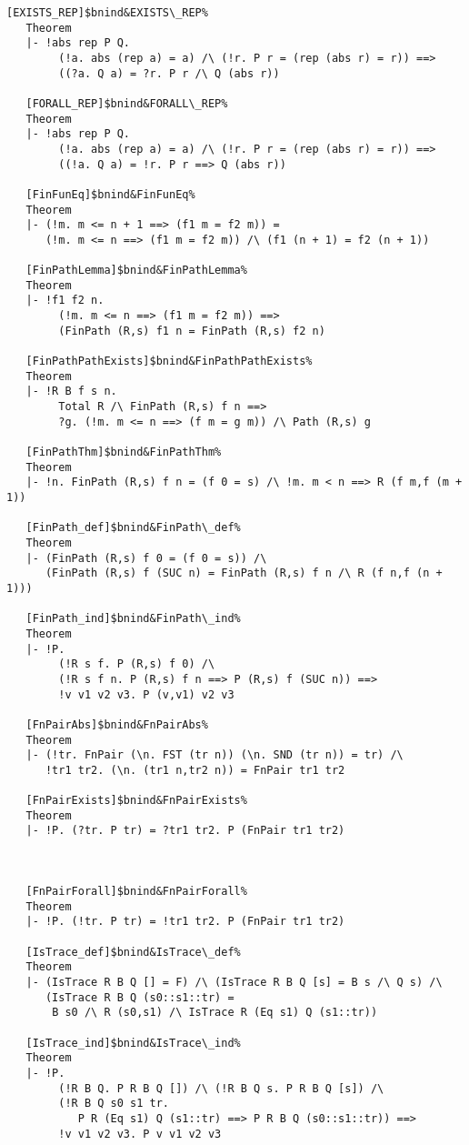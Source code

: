 \documentclass[12pt]{article}
\begin{document}
\begin{footnotesize}
\begin{Verbatim}[commandchars=\$\&\%]
   [EXISTS_REP]$bnind&EXISTS\_REP%
   Theorem
   |- !abs rep P Q.
        (!a. abs (rep a) = a) /\ (!r. P r = (rep (abs r) = r)) ==>
        ((?a. Q a) = ?r. P r /\ Q (abs r))
   
   [FORALL_REP]$bnind&FORALL\_REP%
   Theorem
   |- !abs rep P Q.
        (!a. abs (rep a) = a) /\ (!r. P r = (rep (abs r) = r)) ==>
        ((!a. Q a) = !r. P r ==> Q (abs r))
   
   [FinFunEq]$bnind&FinFunEq%
   Theorem
   |- (!m. m <= n + 1 ==> (f1 m = f2 m)) =
      (!m. m <= n ==> (f1 m = f2 m)) /\ (f1 (n + 1) = f2 (n + 1))
   
   [FinPathLemma]$bnind&FinPathLemma%
   Theorem
   |- !f1 f2 n.
        (!m. m <= n ==> (f1 m = f2 m)) ==>
        (FinPath (R,s) f1 n = FinPath (R,s) f2 n)
   
   [FinPathPathExists]$bnind&FinPathPathExists%
   Theorem
   |- !R B f s n.
        Total R /\ FinPath (R,s) f n ==>
        ?g. (!m. m <= n ==> (f m = g m)) /\ Path (R,s) g
   
   [FinPathThm]$bnind&FinPathThm%
   Theorem
   |- !n. FinPath (R,s) f n = (f 0 = s) /\ !m. m < n ==> R (f m,f (m + 1))
   
   [FinPath_def]$bnind&FinPath\_def%
   Theorem
   |- (FinPath (R,s) f 0 = (f 0 = s)) /\
      (FinPath (R,s) f (SUC n) = FinPath (R,s) f n /\ R (f n,f (n + 1)))
   
   [FinPath_ind]$bnind&FinPath\_ind%
   Theorem
   |- !P.
        (!R s f. P (R,s) f 0) /\
        (!R s f n. P (R,s) f n ==> P (R,s) f (SUC n)) ==>
        !v v1 v2 v3. P (v,v1) v2 v3
   
   [FnPairAbs]$bnind&FnPairAbs%
   Theorem
   |- (!tr. FnPair (\n. FST (tr n)) (\n. SND (tr n)) = tr) /\
      !tr1 tr2. (\n. (tr1 n,tr2 n)) = FnPair tr1 tr2
   
   [FnPairExists]$bnind&FnPairExists%
   Theorem
   |- !P. (?tr. P tr) = ?tr1 tr2. P (FnPair tr1 tr2)
   


   [FnPairForall]$bnind&FnPairForall%
   Theorem
   |- !P. (!tr. P tr) = !tr1 tr2. P (FnPair tr1 tr2)
   
   [IsTrace_def]$bnind&IsTrace\_def%
   Theorem
   |- (IsTrace R B Q [] = F) /\ (IsTrace R B Q [s] = B s /\ Q s) /\
      (IsTrace R B Q (s0::s1::tr) =
       B s0 /\ R (s0,s1) /\ IsTrace R (Eq s1) Q (s1::tr))
   
   [IsTrace_ind]$bnind&IsTrace\_ind%
   Theorem
   |- !P.
        (!R B Q. P R B Q []) /\ (!R B Q s. P R B Q [s]) /\
        (!R B Q s0 s1 tr.
           P R (Eq s1) Q (s1::tr) ==> P R B Q (s0::s1::tr)) ==>
        !v v1 v2 v3. P v v1 v2 v3


\end{Verbatim}
\end{footnotesize}
\end{document}
